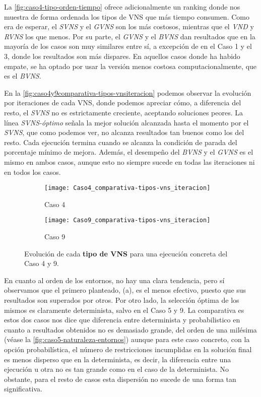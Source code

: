 La \autoref{fig:caso4-tipo-orden-tiempo} ofrece adicionalmente un ranking donde nos muestra de forma ordenada los tipos de VNS que más tiempo consumen. Como era de esperar, el \textit{SVNS} y el \textit{GVNS} son los más costosos, mientras que el \textit{VND} y \textit{RVNS} los que menos. Por su parte, el \textit{GVNS} y el \textit{BVNS} dan resultados que en la mayoría de los casos son muy similares entre sí, a excepción de en el Caso 1 y el 3, donde los resultados son más dispares. En aquellos casos donde ha habido empate, se ha optado por usar la versión menos costosa computacionalmente, que es el \textit{BVNS}.

En la \autoref{fig:caso4y9comparativa-tipos-vnsiteracion} podemos observar la evolución por iteraciones de cada VNS, donde podemos apreciar cómo, a diferencia del resto, el \textit{SVNS} no es estrictamente creciente, aceptando soluciones peores. La línea \textit{SVNS-óptimo} señala la mejor solución alcanzada hasta el momento por el \textit{SVNS}, que como podemos ver, no alcanza resultados tan buenos como los del resto. Cada ejecución termina cuando se alcanza la condición de parada del porcentaje mínimo de mejora. Además, el desempeño del \textit{BVNS} y el \textit{GVNS} es el mismo en ambos casos, aunque esto no siempre sucede en todas las iteraciones ni en todos los casos.

\begin{figure}
	\begin{subfigure}{\linewidth}
		\centering
		\texttt{[image: Caso4\_comparativa-tipos-vns\_iteracion]}
		\caption{Caso 4}
		\label{fig:caso4comparativa-tipos-vnsiteracion}
	\end{subfigure}

	\begin{subfigure}{\linewidth}
		\centering
		\texttt{[image: Caso9\_comparativa-tipos-vns\_iteracion]}
		\caption{Caso 9}
		\label{fig:caso9comparativa-tipos-vnsiteracion}
	\end{subfigure}
	\caption{Evolución de cada \textbf{tipo de VNS} para una ejecución concreta del Caso 4 y 9.}
	\label{fig:caso4y9comparativa-tipos-vnsiteracion}
\end{figure}

En cuanto al orden de los entornos, no hay una clara tendencia, pero sí observamos que el primero planteado, (a), es el menos efectivo, puesto que sus resultados son superados por otros. Por otro lado, la selección óptima de los mismos es claramente determinista, salvo en el Caso 5 y 9. 
La comparativa es estos dos casos nos dice que diferencia entre determinista y probabilistico en cuanto a resultados obtenidos no es demasiado grande, del orden de una milésima (véase la \autoref{fig:caso5-naturaleza-entornos}) aunque para este caso concreto, con la opción probabilística, el número de restricciones incumplidas en la solución final es menos disperso que en la determinista, es decir, la diferencia entre una ejecución u otra no es tan grande como en el caso de la determinista. No obstante, para el resto de casos esta dispersión no sucede de una forma tan significativa.


